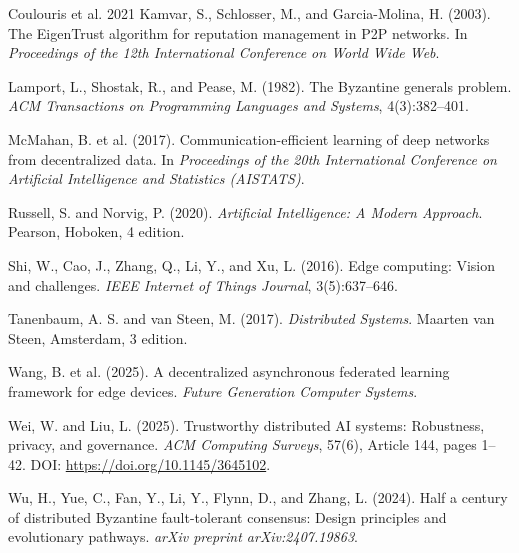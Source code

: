 \documentclass[12pt]{article}
\begin{document}
\begin{thebibliography}{Coulouris et al. 2021}
Kamvar, S., Schlosser, M., and Garcia-Molina, H. (2003). The EigenTrust algorithm for reputation management in P2P networks. In \textit{Proceedings of the 12th International Conference on World Wide Web}.

Lamport, L., Shostak, R., and Pease, M. (1982). The Byzantine generals problem. \textit{ACM Transactions on Programming Languages and Systems}, 4(3):382--401.

McMahan, B. et al. (2017). Communication-efficient learning of deep networks from decentralized data. In \textit{Proceedings of the 20th International Conference on Artificial Intelligence and Statistics (AISTATS)}.

Russell, S. and Norvig, P. (2020). \textit{Artificial Intelligence: A Modern Approach}. Pearson, Hoboken, 4 edition.

Shi, W., Cao, J., Zhang, Q., Li, Y., and Xu, L. (2016). Edge computing: Vision and challenges. \textit{IEEE Internet of Things Journal}, 3(5):637--646.

Tanenbaum, A. S. and van Steen, M. (2017). \textit{Distributed Systems}. Maarten van Steen, Amsterdam, 3 edition.

Wang, B. et al. (2025). A decentralized asynchronous federated learning framework for edge devices. \textit{Future Generation Computer Systems}.

Wei, W. and Liu, L. (2025). Trustworthy distributed AI systems: Robustness, privacy, and governance. \textit{ACM Computing Surveys}, 57(6), Article 144, pages 1--42. DOI: \url{https://doi.org/10.1145/3645102}.

Wu, H., Yue, C., Fan, Y., Li, Y., Flynn, D., and Zhang, L. (2024). Half a century of distributed Byzantine fault-tolerant consensus: Design principles and evolutionary pathways. \textit{arXiv preprint arXiv:2407.19863}.

\end{thebibliography}
\end{document}
